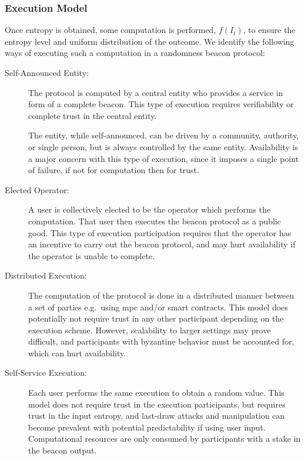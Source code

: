 \subsubsection{Execution Model}
Once entropy is obtained, some computation is performed, $f(I_t)$, to ensure the entropy level and uniform distribution of the outcome.
We identify the following ways of executing such a computation in a randomness beacon protocol:

\begin{description}
    \item[Self-Announced Entity:]
        The protocol is computed by a central entity who provides a service in form of a complete beacon.
        This type of execution requires verifiability or complete trust in the central entity.

        The entity, while self-announced, can be driven by a community, authority, or single person, but is always controlled by the same entity.
        Availability is a major concern with this type of execution, since it imposes a single point of failure, if not for computation then for trust.

    \item[Elected Operator:]
        A user is collectively elected to be the operator which performs the computation.
        That user then executes the beacon protocol as a public good.
        This type of execution participation requires that the operator has an incentive to carry out the beacon protocol, and may hurt availability if the operator is unable to complete.

    \item[Distributed Execution:]
        The computation of the protocol is done in a distributed manner between a set of parties e.g.\ using \gls{mpc} and/or smart contracts.
        This model does potentially not require trust in any other participant depending on the execution scheme.
        However, scalability to larger settings may prove difficult, and participants with byzantine behavior must be accounted for, which can hurt availability.

    \item[Self-Service Execution:]
        Each user performs the same execution to obtain a random value.
        This model does not require trust in the execution participants, but requires trust in the input entropy, and last-draw attacks and manipulation can become prevalent with potential predictability if using user input.
        Computational resources are only consumed by participants with a stake in the beacon output.
\end{description}

